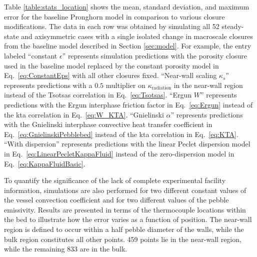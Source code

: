 Table \ref{table:stats_location} shows the mean, standard deviation, and maximum error for the baseline Pronghorn model in comparison to various closure modifications. The data in each row was obtained by simulating all 52 steady-state and axisymmetric cases with a single isolated change in macroscale closures from the baseline model described in Section \ref{sec:model}. For example, the entry labeled ``constant \(\epsilon\)'' represents simulation predictions with the porosity closure used in the baseline model replaced by the constant porosity model in Eq.\ \eqref{eq:ConstantEps} with all other closures fixed. ``Near-wall scaling \(\kappa_s\)'' represents predictions with a \(0.5\) multiplier on \(\kappa_\text{radiation}\) in the near-wall region instead of the Tsotsas correlation in Eq.\ \eqref{eq:Tsotsas}. ``Ergun \(W\)'' represents predictions with the Ergun interphase friction factor in Eq.\ \eqref{eq:Ergun} instead of the \gls{kta} correlation in Eq.\ \eqref{eq:W_KTA}. ``Gnielinski \(\alpha\)'' represents predictions with the Gnielinski interphase convective heat transfer coefficient in Eq.\ \eqref{eq:GnielinskiPebblebed} instead of the \gls{kta} correlation in Eq.\ \eqref{eq:KTA}. ``With dispersion'' represents predictions with the linear Peclet dispersion model in Eq.\ \eqref{eq:LinearPecletKappaFluid} instead of the zero-dispersion model in Eq.\ \eqref{eq:KappaFluidBasic}.

To quantify the significance of the lack of complete experimental facility information, simulations are also performed for two different constant values of the vessel convection coefficient and for two different values of the pebble emissivity. Results are presented in terms of the thermocouple locations within the bed to illustrate how the error varies as a function of position. The near-wall region is defined to occur within a half pebble diameter of the walls, while the bulk region constitutes all other points. 459 points lie in the near-wall region, while the remaining 833 are in the bulk.


